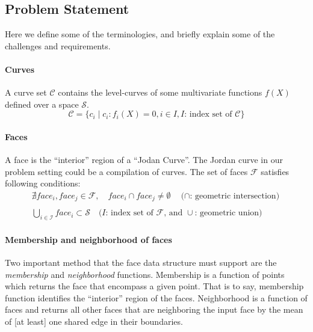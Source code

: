 \subsection{Problem Statement}

Here we define some of the terminologies, and briefly explain some of the challenges and requirements.

\paragraph{Curves}
A curve set $\mathcal{C}$ contains the level-curves of some multivariate functions $f(X)$ defined over a space $\mathcal{S}$.
\[
\mathcal{C} = \lbrace c_i \mid c_i: f_i(X)=0, i \in I, \text{$I$: index set of $\mathcal{C}$} \rbrace
\]

\paragraph{Faces}
A face is the ``interior'' region of a ``Jodan Curve''.
The Jordan curve in our problem setting could be a compilation of curves.
The set of faces $\mathcal{F}$ satisfies following conditions:
\[
\begin{array}{l}
  \nexists face_i , face_j \in \mathcal{F}, \quad face_i \cap face_j \neq \emptyset \quad \text{($\cap$: geometric intersection)}\\
  \quad \\
  \displaystyle\bigcup_{ i \in \mathcal{I} } face_i \subset \mathcal{S} \quad \text{($I$: index set of $\mathcal{F}$, and $\cup$: geometric union)}
\end{array}
\]

\paragraph{Membership and neighborhood of faces}
Two important method that the face data structure must support are the \emph{membership} and \emph{neighborhood} functions.
Membership is a function of points which returns the face that encompass a given point.
That is to say, membership function identifies the ``interior'' region of the faces.
Neighborhood is a function of faces and returns all other faces that are neighboring the input face by the mean of [at least] one shared edge in their boundaries.

